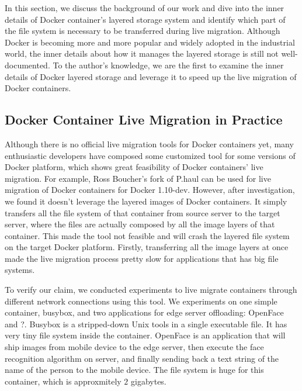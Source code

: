 
In this section, we discuss the background of our work and dive into the inner details of Docker container's layered storage system and identify which part of the file system is necessary to be transferred during live migration. 
Although Docker is becoming more and more popular and widely adopted in the industrial world, the inner details about how it manages the layered storage is still not well-documented. 
To the author's knowledge, we are the first to examine the inner details of Docker layered storage and leverage it to speed up the live migration of Docker containers.






\subsection{Docker Container Live Migration in Practice }\label{migpractice}

Although there is no official live migration tools for Docker containers yet, many enthusiastic developers have composed some customized tool for some versions of Docker platform, which shows great feasibility of Docker containers' live migration. For example, Ross Boucher's fork \cite{boucherPhaul} of P.haul
can be used for live migration of Docker containers for Docker 1.10-dev. However, after investigation, we found it doesn't leverage the layered images of Docker containers. It simply transfers all the file system of that container from source server to the target server, where the files are actually composed by all the image layers of that container. This made the tool not feasible and will crash the layered file system on the target Docker platform. Firstly, transferring all the image layers at once made the live migration process pretty slow for applications that has big file systems. 

To verify our claim, we conducted experiments to live migrate containers through different network connections using this tool. We experiments on one simple container, busybox, and two applications for edge server offloading: OpenFace and ?.  Busybox is a stripped-down Unix tools in a single executable file. It has very tiny file system inside the container. OpenFace\cite{openface2016} is an application that will ship images from mobile device to the edge server, then execute the face recognition algorithm on server, and finally sending back a text string of the name of the person to the mobile device. The file system is huge for this container, which is approxmitely $2$ gigabytes.

